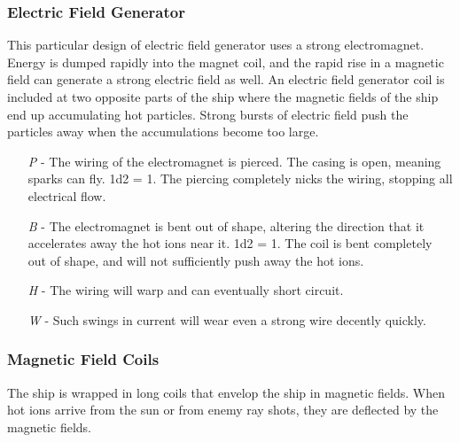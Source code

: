 \documentclass[a4paper]{article}
\begin{document}
\vspace{-0.5cm} \hspace{-18pt} \subsubsection{Electric Field Generator} \label{grid_e_field_generator} \vspace{-0.2cm}
This particular design of electric field generator uses a strong electromagnet. Energy is dumped rapidly into the magnet coil, and the rapid rise in a magnetic field can generate a strong electric field as well. An electric field generator coil is included at two opposite parts of the ship where the magnetic fields of the ship end up accumulating hot particles. Strong bursts of electric field push the particles away when the accumulations become too large.
\begin{enumerate}
\item [\textit{P}] - The wiring of the electromagnet is pierced. The casing is open, meaning sparks can fly. \newline \hspace*{3pt} 1d2 = 1. The piercing completely nicks the wiring, stopping all electrical flow.
\item [\textit{B}] - The electromagnet is bent out of shape, altering the direction that it accelerates away the hot ions near it. \newline \hspace{-3pt} 1d2 = 1. The coil is bent completely out of shape, and will not sufficiently push away the hot ions.
\item [\textit{H}] - The wiring will warp and can eventually short circuit.
\item [\textit{W}] - Such swings in current will wear even a strong wire decently quickly. 
\end{enumerate}

\vspace{-0.5cm} \hspace{-18pt} \subsubsection{Magnetic Field Coils} \label{grid_m_field_coils} \vspace{-0.2cm}
The ship is wrapped in long coils that envelop the ship in magnetic fields. When hot ions arrive from the sun or from enemy ray shots, they are deflected by the magnetic fields. 
\end{document}

